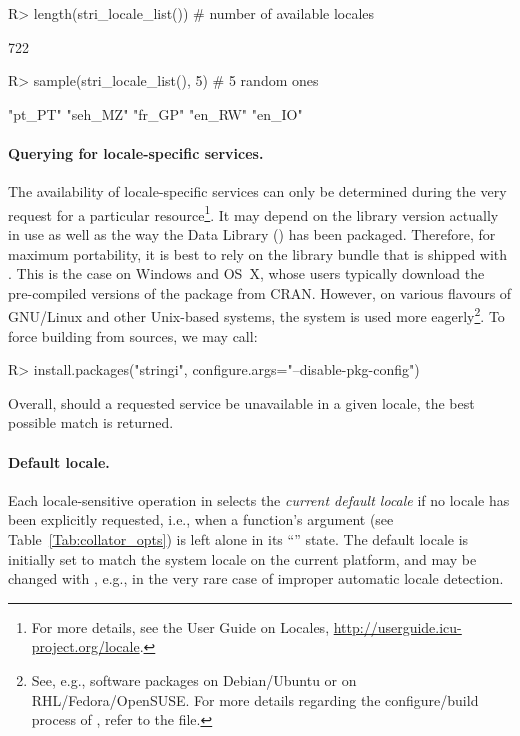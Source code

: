 \documentclass[nojss]{jss}
\begin{document}
\begin{Schunk}
\begin{Sinput}
R> length(stri_locale_list())     # number of available locales
\end{Sinput}
\begin{Soutput}
[1] 722
\end{Soutput}
\begin{Sinput}
R> sample(stri_locale_list(), 5)  # 5 random ones
\end{Sinput}
\begin{Soutput}
[1] "pt_PT"  "seh_MZ" "fr_GP"  "en_RW"  "en_IO"
\end{Soutput}
\end{Schunk}



\paragraph{Querying for locale-specific services.}
The availability of locale-specific services can only be determined during
the very request for a particular resource\footnote{For more details,
see the  User Guide on {Locales}, \url{http://userguide.icu-project.org/locale}.}.
It may depend on the  library version
actually in use as well as the way the  Data Library ()
has been packaged. Therefore, for maximum portability,
it is best to rely on the  library bundle that
is shipped with .
This is the case on Windows and OS~X, whose users typically download the
pre-compiled versions of the package from CRAN.
However, on various flavours of GNU/Linux and other Unix-based systems,
the system  is used more eagerly\footnote{
See, e.g., software packages
 on Debian/Ubuntu or  on RHL/Fedora/OpenSUSE.
For more details regarding the configure/build process of ,
refer to the  file.}.
To force building  from sources, we may call:

\begin{Schunk}
\begin{Sinput}
R> install.packages("stringi", configure.args="--disable-pkg-config")
\end{Sinput}
\end{Schunk}

Overall, should a requested service be unavailable
in a given locale, the best possible match is returned.


\paragraph{Default locale.}
Each locale-sensitive operation in  selects the \textit{current
default locale} if no locale has been explicitly requested,
i.e., when a function's  argument (see Table~\ref{Tab:collator_opts})
is left alone in its ``'' state.
The default locale is initially set to match the system locale on the current
platform, and may be changed with , e.g.,
in the very rare case of improper automatic locale detection.
\end{document}
